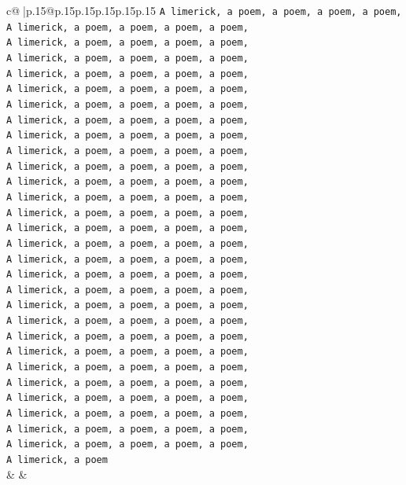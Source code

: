 \documentclass{article}
\begin{document}
{\begin{supertabular}{c@{$\;$}|p{.15\linewidth}@{}p{.15\linewidth}p{.15\linewidth}p{.15\linewidth}p{.15\linewidth}p{.15\linewidth}}
{{{\texttt{A limerick, a poem, a poem, a poem, a poem,} \\
\texttt{A limerick, a poem, a poem, a poem, a poem,} \\
\texttt{A limerick, a poem, a poem, a poem, a poem,} \\
\texttt{A limerick, a poem, a poem, a poem, a poem,} \\
\texttt{A limerick, a poem, a poem, a poem, a poem,} \\
\texttt{A limerick, a poem, a poem, a poem, a poem,} \\
\texttt{A limerick, a poem, a poem, a poem, a poem,} \\
\texttt{A limerick, a poem, a poem, a poem, a poem,} \\
\texttt{A limerick, a poem, a poem, a poem, a poem,} \\
\texttt{A limerick, a poem, a poem, a poem, a poem,} \\
\texttt{A limerick, a poem, a poem, a poem, a poem,} \\
\texttt{A limerick, a poem, a poem, a poem, a poem,} \\
\texttt{A limerick, a poem, a poem, a poem, a poem,} \\
\texttt{A limerick, a poem, a poem, a poem, a poem,} \\
\texttt{A limerick, a poem, a poem, a poem, a poem,} \\
\texttt{A limerick, a poem, a poem, a poem, a poem,} \\
\texttt{A limerick, a poem, a poem, a poem, a poem,} \\
\texttt{A limerick, a poem, a poem, a poem, a poem,} \\
\texttt{A limerick, a poem, a poem, a poem, a poem,} \\
\texttt{A limerick, a poem, a poem, a poem, a poem,} \\
\texttt{A limerick, a poem, a poem, a poem, a poem,} \\
\texttt{A limerick, a poem, a poem, a poem, a poem,} \\
\texttt{A limerick, a poem, a poem, a poem, a poem,} \\
\texttt{A limerick, a poem, a poem, a poem, a poem,} \\
\texttt{A limerick, a poem, a poem, a poem, a poem,} \\
\texttt{A limerick, a poem, a poem, a poem, a poem,} \\
\texttt{A limerick, a poem, a poem, a poem, a poem,} \\
\texttt{A limerick, a poem, a poem, a poem, a poem,} \\
\texttt{A limerick, a poem, a poem, a poem, a poem,} \\
\texttt{A limerick, a poem} \\
            }
        }
    }
    & & \\ \\


\end{supertabular}}
\end{document}
